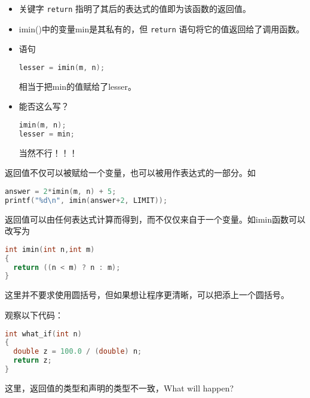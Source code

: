 \begin{frame}[fragile]
\begin{itemize}
\item
关键字 \lstinline|return| 指明了其后的表达式的值即为该函数的返回值。\\[0.1in]
\item 
{\tf imin()}中的变量{\tf min}是其私有的，但 \lstinline|return| 语句将它的值返回给了调用函数。\\[0.1in]
\item 
语句
\begin{lstlisting}[language=c,backgroundcolor=\color{red!10}]
lesser = imin(m, n);
\end{lstlisting}
相当于把min的值赋给了lesser。
\\[0.1in]
\item
能否这么写？
\begin{lstlisting}[language=c,backgroundcolor=\color{red!10}]
imin(m, n);
lesser = min;
\end{lstlisting} \pause
{\Huge 当然不行！！！}
\end{itemize}
\end{frame}

\begin{frame}[fragile]
返回值不仅可以被赋给一个变量，也可以被用作表达式的一部分。如
\begin{lstlisting}[language=c,backgroundcolor=\color{red!10}]
answer = 2*imin(m, n) + 5;
printf("%d\n", imin(answer+2, LIMIT));
\end{lstlisting}

\end{frame}

\begin{frame}[fragile]
返回值可以由任何表达式计算而得到，而不仅仅来自于一个变量。如imin函数可以改写为
\begin{lstlisting}[language=c,backgroundcolor=\color{red!10}]
int imin(int n,int m)
{  
  return ((n < m) ? n : m);
}
\end{lstlisting}
这里并不要求使用圆括号，但如果想让程序更清晰，可以把添上一个圆括号。
\end{frame}

\begin{frame}[fragile]
观察以下代码：
\begin{lstlisting}[language=c,backgroundcolor=\color{red!10}]
int what_if(int n)
{  
  double z = 100.0 / (double) n;
  return z;
}
\end{lstlisting}
这里，返回值的类型和声明的类型不一致，{\Large What will happen?}
\pause 
\vspace{0.1in}


\end{frame}

